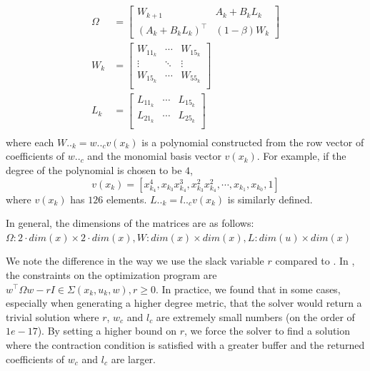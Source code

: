 \documentclass[journal]{IEEEtran}
\begin{document}
\begin{equation}
	\label{eq:dccm_opt_params}
	\begin{aligned}
	\Omega &=
	\begin{bmatrix}
		W_{k+1} & A_k + B_k L_k \\
		(A_k + B_k L_k)^\top & (1 - \beta) W_k
	\end{bmatrix} \\
	W_k &= 
	\begin{bmatrix}
		W_{11_k} & \cdots & W_{15_k} \\
		\vdots & \ddots & \vdots \\
		W_{15_k} & \cdots & W_{55_k} \\
	\end{bmatrix} \\
	L_k &=
	\begin{bmatrix}
		L_{11_k} & \cdots & L_{15_k} \\
		L_{21_k} & \cdots & L_{25_k} \\
	\end{bmatrix} \\
	\end{aligned}
\end{equation}
where each $W.._{k} = w.._c v(x_k)$ is a polynomial constructed from the row vector of coefficients of $w.._c$ and the monomial basis vector $v(x_k)$. For example, if the degree of the polynomial is chosen to be $4$,
\begin{equation}
	v(x_k) = [x^4_{k_4}, x_{k_3}x^3_{k_4}, x^2_{k_3}x^2_{k_4}, \cdots ,x_{k_1}, x_{k_0}, 1]
\end{equation}
where $v(x_k)$ has $126$ elements. $L.._k = l.._c v(x_k)$ is similarly defined.

In general, the dimensions of the matrices are as follows: $\Omega: 2 \cdot dim(x) \times 2 \cdot dim(x), W: dim(x) \times dim(x), L: dim(u) \times dim(x)$

We note the difference in the way we use the slack variable $r$ compared to \autocite{weiControlContractionMetric2021}. In \autocite{weiControlContractionMetric2021}, the constraints on the optimization program are $w^\top \Omega w - r I \in \Sigma(x_k, u_k, w), r \geq 0$. In practice, we found that in some cases, especially when generating a higher degree metric, that the solver would return a trivial solution where $r$, $w_c$ and $l_c$ are extremely small numbers (on the order of $1e-17$). By setting a higher bound on $r$, we force the solver to find a solution where the contraction condition is satisfied with a greater buffer and the returned coefficients of $w_c$ and $l_c$ are larger.
\end{document}
